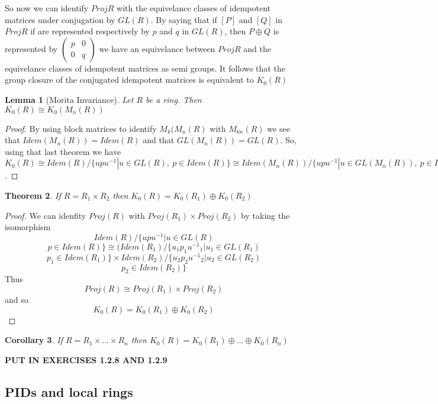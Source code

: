 \documentclass[a4paper,10pt]{article}
\newtheorem{thm}{Theorem}[subsection]
\newtheorem{lem}[thm]{Lemma}
\newtheorem{cor}[thm]{Corollary}
\begin{document}
So now we can identify $ProjR$ with the equivelance classes of idempotent matrices under conjugation by $GL(R)$. By saying that if $[P]$ and $[Q]$ in $ProjR$ if are represented respectively by $p$ and $q$ in $GL(R)$, then $P\oplus Q$ is represented by $\left(\begin{array}{cc} p & 0 \\ 0 & q \end{array}\right)$ we have an equivelance between $ProjR$ and the equivelance classes of idempotent matrices as semi groups. It follows that the group closure of the conjugated idempotent matrices is equivalent to $K_{0}(R)$

\begin{lem}[Morita Invariance]
	Let $R$ be a ring. Then $K_{0}(R)\cong K_{0}(M_{n}(R))$
\end{lem}
\begin{proof}
	By using block matrices to identify $M_{k}(M_{n}(R)$ with $M_{kn}(R)$ we see that $Idem(M_{n}(R))=Idem(R)$ and that $GL(M_{n}(R))=GL(R)$. So, using that last theorem we have $K_{0}(R)\cong Idem(R)/\{upu^{-1}|u\in GL(R),\ p\in Idem(R)\}\cong Idem(M_{n}(R))/\{upu^{-1}|u\in GL(M_{n}(R)),\ p\in Idem(M_{n}(R))\}\cong K_{0}(M_{n}(R)$.
\end{proof}

\begin{thm}
	If $R=R_{1}\times R_{2}$ then $K_{0}(R)=K_{0}(R_{1})\oplus K_{0}(R_{2})$
\end{thm}
\begin{proof}
	We can idenfity $Proj(R)$ with $Proj(R_{1})\times Proj(R_{2})$ by taking the isomorphism $$Idem(R)/\{upu^{-1}|u\in GL(R)$$ $$ p\in Idem(R)\}\cong (Idem(R_{1})/\{u_{1}p_{1}{u^{-1}}_{1}|u_{1}\in GL(R_{1})$$ $$p_{1}\in Idem(R_{1})\}\times Idem(R_{2})/\{u_{2}p_{2}{u^{-1}}_{2}|u_{2}\in GL(R_{2})$$ $$p_{2}\in Idem(R_{2})\}$$ Thus $$Proj(R)\cong Proj(R_{1})\times Proj(R_{2})$$ and so $$K_{0}(R)=K_{0}(R_{1})\oplus K_{0}(R_{2})$$
\end{proof}

\begin{cor}
	If $R=R_{1}\times\ldots\times R_{n}$ then $K_{0}(R)=K_{0}(R_{1})\oplus\ldots\oplus K_{0}(R_{n})$
\end{cor}


\textbf{PUT IN EXERCISES 1.2.8 AND 1.2.9}

\subsection{PIDs and local rings}
\end{document}
